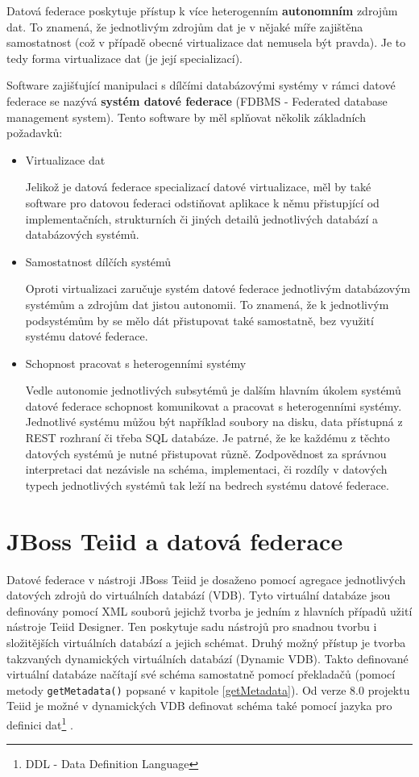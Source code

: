 \documentclass[oneside,12pt]{fithesis2}
\begin{document}
Datová federace poskytuje přístup k více heterogenním \textbf{autonomním} zdrojům dat. To znamená, že jednotlivým zdrojům dat je v nějaké míře zajištěna samostatnost (což v případě obecné virtualizace dat nemusela být pravda). Je to tedy forma virtualizace dat (je její specializací).

Software zajišťující manipulaci s dílčími databázovými systémy v rámci datové federace se nazývá \textbf{systém datové federace} (FDBMS - Federated database management system)\cite{fdbms}. Tento software by měl splňovat několik základních požadavků:
\begin{itemize}
 \item Virtualizace dat
 
 Jelikož je datová federace specializací datové virtualizace, měl by také software pro datovou federaci odstiňovat aplikace k němu přistupjící od implementačních, strukturních či jiných detailů jednotlivých databází a databázových systémů.
 
 \item Samostatnost dílčích systémů
 
 Oproti  virtualizaci zaručuje systém datové federace jednotlivým databázovým systémům a zdrojům dat jistou autonomii. To znamená, že k jednotlivým podsystémům by se mělo dát přistupovat také samostatně, bez využití systému datové federace.
 
 \item Schopnost pracovat s heterogenními systémy
 
 Vedle autonomie jednotlivých subsytémů je dalším hlavním úkolem systémů datové federace schopnost komunikovat a pracovat s heterogenními systémy. Jednotlivé systému můžou být například soubory na disku, data přístupná z REST rozhraní či třeba SQL databáze. Je patrné, že ke každému z těchto datových systémů je nutné přistupovat různě. Zodpovědnost za správnou interpretaci dat nezávisle na schéma, implementaci, či rozdíly v datových typech jednotlivých systémů tak leží na bedrech systému datové federace.
\end{itemize} 

\section{JBoss Teiid a datová federace}
Datové federace v nástroji JBoss Teiid je dosaženo pomocí agregace jednotlivých datových zdrojů do virtuálních databází (VDB). Tyto virtuální databáze jsou definovány pomocí XML souborů jejichž tvorba je jedním z hlavních případů užití nástroje Teiid Designer. Ten poskytuje sadu nástrojů pro snadnou tvorbu i složitějších virtuálních databází a jejich schémat. Druhý možný přístup je tvorba takzvaných dynamických virtuálních databází (Dynamic VDB). Takto definované virtuální databáze načítají své schéma samostatně pomocí překladačů (pomocí metody \verb'getMetadata()' popsané v kapitole \ref{getMetadata}). Od verze 8.0 projektu Teiid je možné v dynamických VDB definovat schéma také pomocí jazyka pro definici dat\footnote{DDL - Data Definition Language} \cite[Reference Guide$\rightarrow$VDBs$\rightarrow$DDL Metadata]{teiidDoc}.
\end{document}
